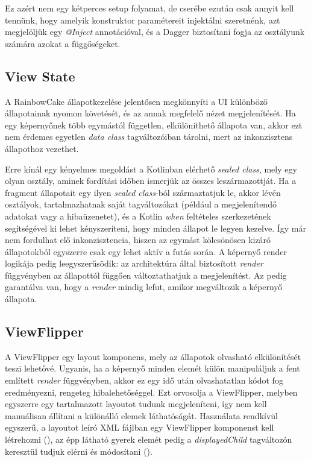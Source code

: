 Ez azért nem egy kétperces setup folyamat, de cserébe ezután csak annyit kell tennünk, hogy amelyik konstruktor paramétereit injektálni szeretnénk, azt megjelöljük egy \emph{@Inject} annotációval, és a Dagger biztosítani fogja az osztályunk számára azokat a függőségeket. 

\subsection{View State}
A RainbowCake állapotkezelése jelentősen megkönnyíti a UI különböző állapotainak nyomon követését, és az annak megfelelő nézet megjelenítését. Ha egy képernyőnek több egymástól független, elkülöníthető állapota van, akkor ezt nem érdemes egyetlen \emph{data class} tagváltozóiban tárolni, mert az inkonzisztens állapothoz vezethet.\cite{ViewState} 

Erre kínál egy kényelmes megoldást a Kotlinban elérhető \emph{sealed class}, mely egy olyan osztály, aminek fordítási időben ismerjük az összes leszármazottját. Ha a fragment állapotait egy ilyen \emph{sealed class}-ból származtatjuk le, akkor lévén osztályok, tartalmazhatnak saját tagváltozókat (például a megjelenítendő adatokat vagy a hibaüzenetet), és a Kotlin \emph{when} feltételes szerkezetének segítségével ki lehet kényszeríteni, hogy minden állapot le legyen kezelve. Így már nem fordulhat elő inkonzisztencia, hiszen az egymást kölcsönösen kizáró állapotokból egyszerre csak egy lehet aktív a futás során. A képernyő render logikája pedig leegyszerűsödik: az architektúra által biztosított \emph{render} függvényben az állapottól függően változtathatjuk a megjelenítést. Az pedig garantálva van, hogy a \emph{render} mindig lefut, amikor megváltozik a képernyő állapota.

\subsection{ViewFlipper}
A ViewFlipper egy layout komponens, mely az állapotok olvasható elkülönítését teszi lehetővé. \cite{ViewFlipper} Ugyanis, ha a képernyő minden elemét külön manipuláljuk a fent említett \emph{render} függvényben, akkor ez egy idő után olvashatatlan kódot fog eredményezni, rengeteg hibalehetőséggel. Ezt orvosolja a ViewFlipper, melyben egyszerre egy tartalmazott layoutot tudunk megjeleníteni, így nem kell manuálisan állítani a különálló elemek láthatóságát. Használata rendkívül egyszerű, a layoutot leíró XML fájlban egy ViewFlipper komponenst kell létrehozni (), az épp látható gyerek elemét pedig a \emph{displayedChild} tagváltozón keresztül tudjuk elérni és módosítani ().

